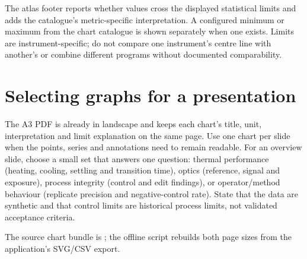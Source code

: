 The atlas footer reports whether values cross the displayed statistical limits and adds the catalogue's metric-specific
interpretation. A configured minimum or maximum from the chart catalogue is shown separately when one exists. Limits are
instrument-specific; do not compare one instrument's centre line with another's or combine different programs without
documented comparability.

\section{Selecting graphs for a presentation}
The A3 PDF is already in landscape and keeps each chart's title, unit, interpretation and limit explanation on the same
page. Use one chart per slide when the points, series and annotations need to remain readable. For an overview slide,
choose a small set that answers one question: thermal performance (heating, cooling, settling and transition time),
optics (reference, signal and exposure), process integrity (control and edit findings), or operator/method behaviour
(replicate precision and negative-control rate). State that the data are synthetic and that control limits are
historical process limits, not validated acceptance criteria.

The source chart bundle is ; the offline script
 rebuilds both page sizes from the application's SVG/CSV export.


